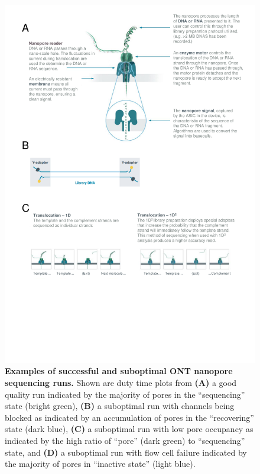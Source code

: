 \begin{figure}[]
	\centering
	\includegraphics[page=6,trim={0 14cm 0 0 },clip, scale = 0.8]{Figures/ProjectDevelopment_FiguresONT}
	\captionsetup{width=0.95\textwidth}
	\caption[Examples of successful and suboptimal ONT nanopore sequencing runs]%
	{\textbf{Examples of successful and suboptimal ONT nanopore sequencing runs.} Shown are duty time plots from \textbf{(A)} a good quality run indicated by the majority of pores in the “sequencing” state (bright green), \textbf{(B)} a suboptimal run with channels being blocked as indicated by an accumulation of pores in the “recovering” state (dark blue), \textbf{(C)} a suboptimal run with low pore occupancy as indicated by the high ratio of “pore” (dark green) to “sequencing” state, and \textbf{(D)} a suboptimal run with flow cell failure indicated by the majority of pores in “inactive state” (light blue). 
}
\end{figure}
